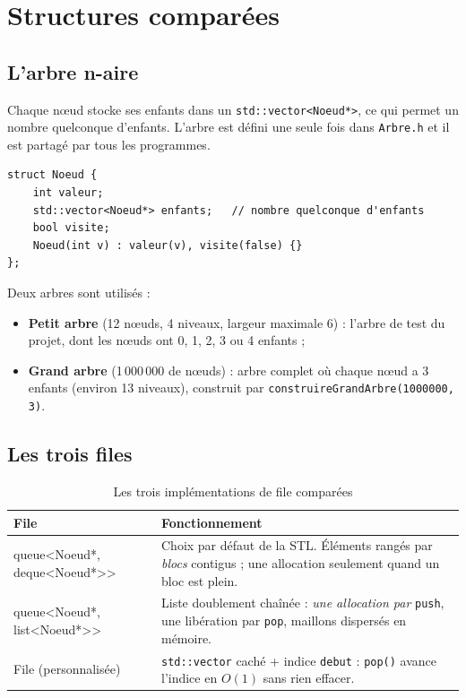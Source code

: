 \documentclass[11pt,a4paper]{article}
\begin{document}
\section{Structures comparées}

\subsection{L'arbre n-aire}

Chaque nœud stocke ses enfants dans un \texttt{std::vector<Noeud*>}, ce qui permet un nombre
quelconque d'enfants. L'arbre est défini une seule fois dans \texttt{Arbre.h} et il est partagé
par tous les programmes.

\begin{lstlisting}
struct Noeud {
    int valeur;
    std::vector<Noeud*> enfants;   // nombre quelconque d'enfants
    bool visite;
    Noeud(int v) : valeur(v), visite(false) {}
};
\end{lstlisting}

Deux arbres sont utilisés :
\begin{itemize}
  \item \textbf{Petit arbre} (12 nœuds, 4 niveaux, largeur maximale 6) : l'arbre de test du projet,
        dont les nœuds ont 0, 1, 2, 3 ou 4 enfants ;
  \item \textbf{Grand arbre} (1\,000\,000 de nœuds) : arbre complet où chaque nœud a 3 enfants
        (environ 13 niveaux), construit par \texttt{construireGrandArbre(1000000, 3)}.
\end{itemize}

\subsection{Les trois files}

\begin{table}[H]
\centering
\begin{tabular}{>{\ttfamily}l p{9cm}}
\toprule
\normalfont\textbf{File} & \textbf{Fonctionnement} \\
\midrule
queue<Noeud*, deque<Noeud*>> & Choix par défaut de la STL. Éléments rangés par \emph{blocs}
                                contigus ; une allocation seulement quand un bloc est plein. \\
queue<Noeud*, list<Noeud*>>  & Liste doublement chaînée : \emph{une allocation par} \texttt{push},
                                une libération par \texttt{pop}, maillons dispersés en mémoire. \\
File (personnalisée)                & \texttt{std::vector} caché + indice \texttt{debut} :
                                \texttt{pop()} avance l'indice en $O(1)$ sans rien effacer. \\
\bottomrule
\end{tabular}
\caption{Les trois implémentations de file comparées}
\end{table}
\end{document}
